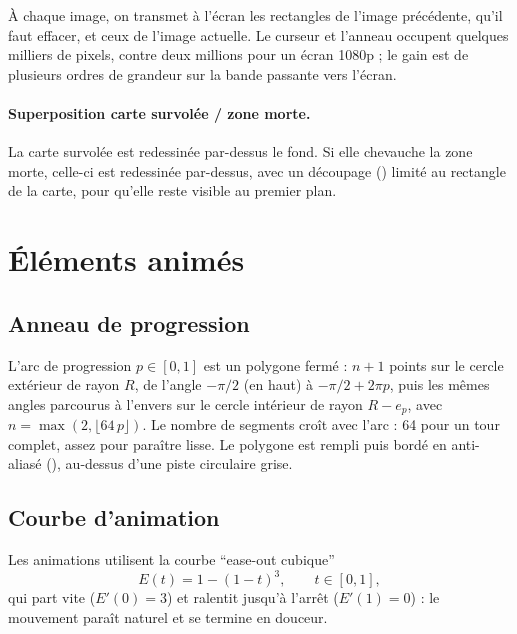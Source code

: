 À chaque image, on transmet à l'écran les rectangles de l'image précédente, qu'il faut effacer, et ceux de l'image actuelle. Le curseur et l'anneau occupent quelques milliers de pixels, contre deux millions pour un écran 1080p ; le gain est de plusieurs ordres de grandeur sur la bande passante vers l'écran.

\paragraph{Superposition carte survolée / zone morte.} La carte survolée est redessinée par-dessus le fond. Si elle chevauche la zone morte, celle-ci est redessinée par-dessus, avec un découpage () limité au rectangle de la carte, pour qu'elle reste visible au premier plan.

\section{Éléments animés}

\subsection{Anneau de progression}

L'arc de progression $p \in [0,1]$ est un polygone fermé : $n + 1$ points sur le cercle extérieur de rayon $R$, de l'angle $-\pi/2$ (en haut) à $-\pi/2 + 2\pi p$, puis les mêmes angles parcourus à l'envers sur le cercle intérieur de rayon $R - e_p$, avec $n = \max(2, \lfloor 64\,p\rfloor)$. Le nombre de segments croît avec l'arc : 64 pour un tour complet, assez pour paraître lisse. Le polygone est rempli puis bordé en anti-aliasé (), au-dessus d'une piste circulaire grise.

\subsection{Courbe d'animation}

Les animations utilisent la courbe \enquote{ease-out cubique}
\begin{equation}
  E(t) = 1 - (1 - t)^3, \qquad t \in [0, 1],
\end{equation}
qui part vite ($E'(0) = 3$) et ralentit jusqu'à l'arrêt ($E'(1) = 0$) : le mouvement paraît naturel et se termine en douceur.

